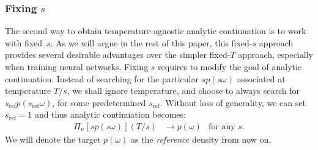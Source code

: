 \documentclass[notitlepage, 11pt, nofootinbib]{revtex4-1}
\begin{document}
\subsubsection{Fixing $s$}
\label{sec_usage}
The second way to obtain temperature-agnostic analytic continuation is to work with fixed~$s$. As we will argue in the rest of this paper, this fixed-$s$ approach provides several desirable advantages over the simpler fixed-$T$ approach, especially when training neural networks. Fixing $s$ requires to modify the goal of analytic continuation. Instead of searching for the particular $sp(s\omega)$ associated at temperature $T/s$, we shall ignore temperature, and choose to always search for $s_\text{ref}p(s_\text{ref}\omega)$, for some predetermined $s_\text{ref}$. Without loss of generality, we can set $s_\text{ref}=1$ and thus analytic continuation becomes:
\begin{align}
    \Pi_n[sp(s\omega)](T/s) &\longrightarrow p(\omega) &\text{for any }s.
    \label{eq_agnostic_ac}
\end{align}
We will denote the target $p(\omega)$ as the \emph{reference} density from now on.
\end{document}
